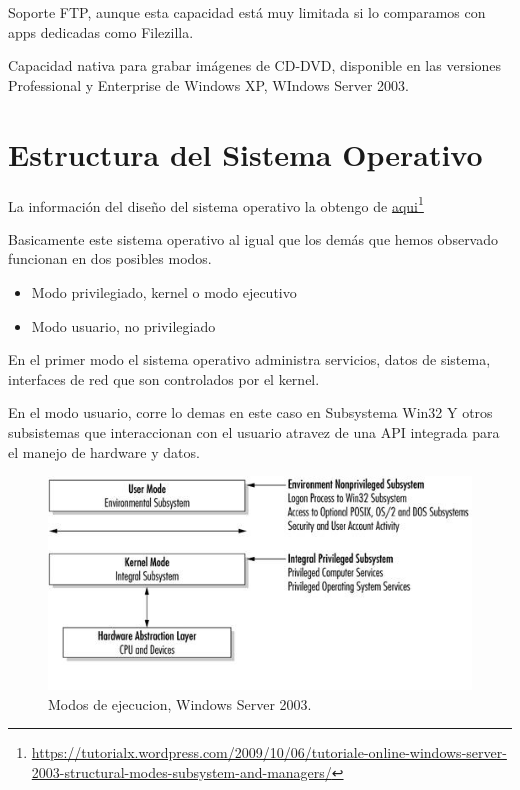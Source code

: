 \documentclass[paper=a4, fontsize=12pt]{article} 		%
\newcommand\fnurl[2]{%
\href{#2}{#1}\footnote{\url{#2}}%
}
\numberwithin{equation}{section}						%
\numberwithin{table}{section} 							%
\begin{document}
Soporte FTP, aunque esta capacidad está muy limitada si lo comparamos con apps dedicadas como Filezilla.

Capacidad nativa para grabar imágenes de CD-DVD, disponible en las versiones Professional y Enterprise de Windows XP,  WIndows Server 2003.

\section{Estructura del Sistema Operativo}
La información del diseño del sistema operativo la obtengo de \fnurl{aqui}{https://tutorialx.wordpress.com/2009/10/06/tutoriale-online-windows-server-2003-structural-modes-subsystem-and-managers/}
Basicamente este sistema operativo al igual que los demás que hemos observado funcionan en dos posibles modos.
\begin{itemize}
\item Modo privilegiado, kernel o modo ejecutivo
\item Modo usuario, no privilegiado
\end{itemize}

En el primer modo el sistema operativo administra servicios, datos de sistema, interfaces de red que son controlados por el kernel.

En el modo usuario, corre lo demas en este caso en Subsystema Win32 Y otros subsistemas que interaccionan con el usuario atravez de una API integrada para el manejo de hardware y datos.
\begin{center}
\begin{figure}[H]
\includegraphics[scale=0.98]{imgs/kernelmodes.jpg}
\caption{Modos de ejecucion, Windows Server 2003.}
\label{fig:mejora}
\end{figure}
\end{center}
\end{document}
